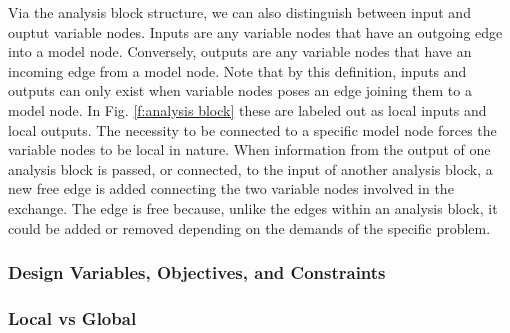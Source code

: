 Via the analysis block structure, we can also distinguish between input and ouptut
variable nodes. Inputs are any variable nodes that have an outgoing edge into a model 
node. Conversely, outputs are any variable nodes that have an incoming edge from a model node. 
Note that by this definition, inputs and outputs can only exist when variable nodes poses an 
edge joining them to a model node. In Fig. \ref{f:analysis block} these are labeled out as 
local inputs and local outputs. The necessity to be connected to a specific model node forces
the variable nodes to be local in nature. When information from the output of one analysis 
block is passed, or connected, to the input of another analysis block, a new free edge is added 
connecting the two variable nodes involved in the exchange. The edge is free because, unlike the edges 
within an analysis block, it could be added or removed depending on the demands of the specific problem. 


\subsubsection{Design Variables, Objectives, and Constraints}

\subsubsection{Local vs Global}

\subsubsection{}

